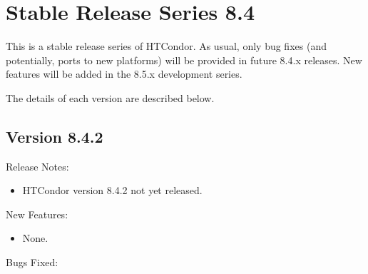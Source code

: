 
\section{\label{sec:History-8-4}Stable Release Series 8.4}

This is a stable release series of HTCondor.
As usual, only bug fixes (and potentially, ports to new platforms)
will be provided in future 8.4.x releases.
New features will be added in the 8.5.x development series.

The details of each version are described below.

\subsection*{\label{sec:New-8-4-2}Version 8.4.2}

\noindent Release Notes:

\begin{itemize}

\item HTCondor version 8.4.2 not yet released.

\end{itemize}


\noindent New Features:

\begin{itemize}

\item None.

\end{itemize}

\noindent Bugs Fixed:

